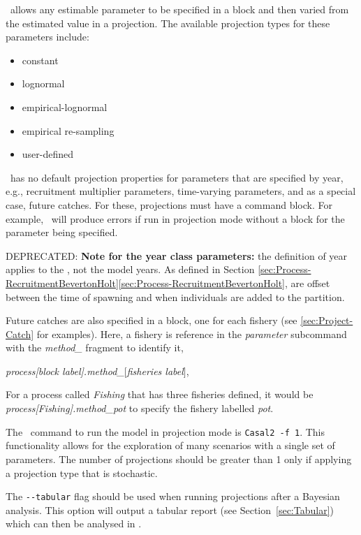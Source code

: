 \CNAME\ allows any estimable parameter to be specified in a  block and then varied from the estimated value in a projection. The available projection types for these parameters include:

\begin{itemize}
	\item constant
	\item lognormal
	\item empirical-lognormal
	\item empirical re-sampling
	\item user-defined
\end{itemize}

\CNAME\ has no default projection properties for parameters that are specified by year, e.g., recruitment multiplier parameters, time-varying parameters, and as a special case, future catches. For these, projections  must have a  command block. For example, \CNAME\ will produce errors if run in projection mode without a  block for the  parameter being specified.

DEPRECATED: \textbf{Note for the year class parameters:} the definition of year applies to the , not the model years. As defined in Section \ifAgeBased \ref{sec:Process-RecruitmentBevertonHolt}\else \ref{sec:Process-RecruitmentBevertonHolt}\fi,  are offset between the time of spawning and when individuals are added to the partition.

Future catches are also specified in a  block, one for each fishery (see \ref{sec:Project-Catch} for examples). Here, a fishery is reference in the \textit{parameter} subcommand with the \textit{method\_} fragment to identify it,

 \textit{process[block label].method\_$[$fisheries label$]$},

For a process called \textit{Fishing} that has three fisheries defined, it would be \textit{process[Fishing].method\_pot} to specify the fishery labelled \textit{pot}.

The \CNAME\ command to run the model in projection mode is \texttt{Casal2 -f 1}. This functionality allows for the exploration of many scenarios with a single set of parameters. The number of projections should be greater than 1 only if applying a projection type that is stochastic.

The \texttt{-{}-tabular} flag should be used when running projections after a Bayesian analysis. This option will output a tabular report (see Section~\ref{sec:Tabular}) which can then be analysed in \R.

